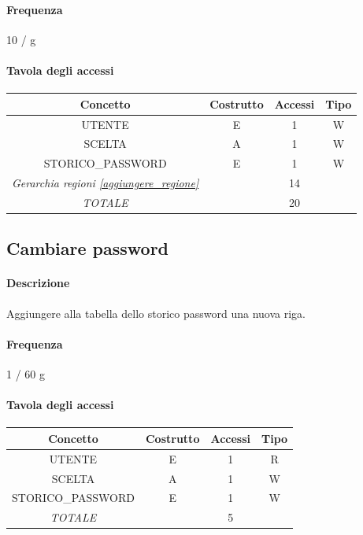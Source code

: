 \documentclass[a4paper,12pt]{report}
\begin{document}
\paragraph{Frequenza} 10 / g 
\begin{table}[H]
\paragraph{Tavola degli accessi\newline}
\begin{tabular}{|c|c|c|c|}
\hline
Concetto          & Costrutto & Accessi & Tipo \\ \hline
UTENTE            & E         & 1       & W    \\ \hline
SCELTA           & A         & 1       & W    \\ \hline
STORICO\_PASSWORD & E         & 1       & W    \\ \hline
\textit{Gerarchia regioni \ref{aggiungere_regione}} &  & 14      &      \\ \hline 
\textit{TOTALE}   &           & 20       &      \\ \hline
\end{tabular}
\end{table}
\subsection{Cambiare password} \label{cambio_password}
\paragraph{Descrizione} Aggiungere alla tabella dello storico password una nuova riga. 
\paragraph{Frequenza} 1 / 60 g 
\begin{table}[H]
\paragraph{Tavola degli accessi\newline}
\begin{tabular}{|c|c|c|c|}
\hline
Concetto          & Costrutto & Accessi & Tipo \\ \hline
UTENTE            & E         & 1       & R    \\ \hline
SCELTA            & A         & 1       & W    \\ \hline
STORICO\_PASSWORD & E         & 1       & W    \\ \hline
\textit{TOTALE}   &           & 5       &      \\ \hline
\end{tabular}
\end{table}
\end{document}
